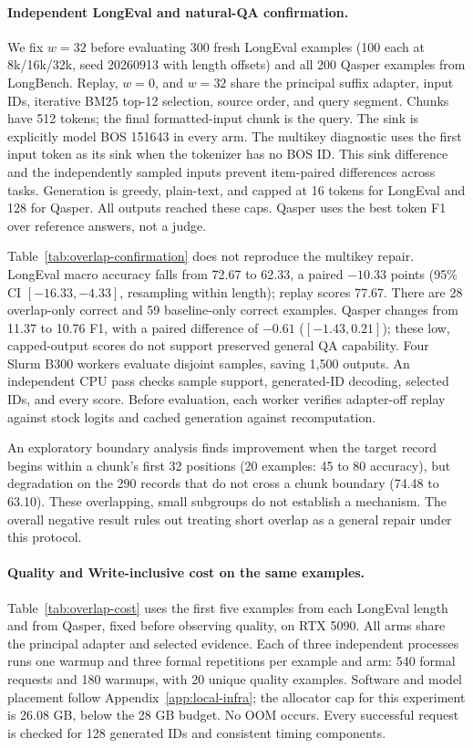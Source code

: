 \paragraph{Independent LongEval and natural-QA confirmation.}
\label{app:overlap-confirmation}

We fix $w=32$ before evaluating 300 fresh LongEval examples (100 each at 8k/16k/32k, seed 20260913 with length offsets) and all 200 Qasper examples from LongBench. Replay, $w=0$, and $w=32$ share the principal suffix adapter, input IDs, iterative BM25 top-12 selection, source order, and query segment. Chunks have 512 tokens; the final formatted-input chunk is the query. The sink is explicitly model BOS 151643 in every arm. The multikey diagnostic uses the first input token as its sink when the tokenizer has no BOS ID. This sink difference and the independently sampled inputs prevent item-paired differences across tasks. Generation is greedy, plain-text, and capped at 16 tokens for LongEval and 128 for Qasper. All outputs reached these caps. Qasper uses the best token F1 over reference answers, not a judge.

Table~\ref{tab:overlap-confirmation} does not reproduce the multikey repair. LongEval macro accuracy falls from 72.67 to 62.33, a paired $-10.33$ points (95\% CI $[-16.33,-4.33]$, resampling within length); replay scores 77.67. There are 28 overlap-only correct and 59 baseline-only correct examples. Qasper changes from 11.37 to 10.76 F1, with a paired difference of $-0.61$ ($[-1.43,0.21]$); these low, capped-output scores do not support preserved general QA capability. Four Slurm B300 workers evaluate disjoint samples, saving 1,500 outputs. An independent CPU pass checks sample support, generated-ID decoding, selected IDs, and every score. Before evaluation, each worker verifies adapter-off replay against stock logits and cached generation against recomputation.

An exploratory boundary analysis finds improvement when the target record begins within a chunk's first 32 positions (20 examples: 45 to 80 accuracy), but degradation on the 290 records that do not cross a chunk boundary (74.48 to 63.10). These overlapping, small subgroups do not establish a mechanism. The overall negative result rules out treating short overlap as a general repair under this protocol.

\paragraph{Quality and Write-inclusive cost on the same examples.}
\label{app:overlap-cost}

Table~\ref{tab:overlap-cost} uses the first five examples from each LongEval length and from Qasper, fixed before observing quality, on RTX 5090. All arms share the principal adapter and selected evidence. Each of three independent processes runs one warmup and three formal repetitions per example and arm: 540 formal requests and 180 warmups, with 20 unique quality examples. Software and model placement follow Appendix~\ref{app:local-infra}; the allocator cap for this experiment is 26.08 GB, below the 28 GB budget. No OOM occurs. Every successful request is checked for 128 generated IDs and consistent timing components.

